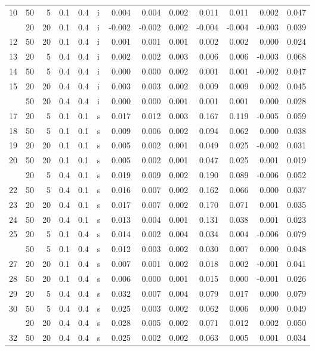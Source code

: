 \documentclass[
  11pt,
]{article}
\begin{document}
\begin{table}[!h]
{\begin{tabular}[t]{rrrrrlrrrrrrr}
10 & 50 & 5 & 0.1 & 0.4 & i & 0.004 & 0.004 & 0.002 & 0.011 & 0.011 & 0.002 & 0.047\\
\addlinespace
11 & 20 & 20 & 0.1 & 0.4 & i & -0.002 & -0.002 & 0.002 & -0.004 & -0.004 & -0.003 & 0.039\\
12 & 50 & 20 & 0.1 & 0.4 & i & 0.001 & 0.001 & 0.001 & 0.002 & 0.002 & 0.000 & 0.024\\
13 & 20 & 5 & 0.4 & 0.4 & i & 0.002 & 0.002 & 0.003 & 0.006 & 0.006 & -0.003 & 0.068\\
14 & 50 & 5 & 0.4 & 0.4 & i & 0.000 & 0.000 & 0.002 & 0.001 & 0.001 & -0.002 & 0.047\\
15 & 20 & 20 & 0.4 & 0.4 & i & 0.003 & 0.003 & 0.002 & 0.009 & 0.009 & 0.002 & 0.045\\
\addlinespace
16 & 50 & 20 & 0.4 & 0.4 & i & 0.000 & 0.000 & 0.001 & 0.001 & 0.001 & 0.000 & 0.028\\
17 & 20 & 5 & 0.1 & 0.1 & s & 0.017 & 0.012 & 0.003 & 0.167 & 0.119 & -0.005 & 0.059\\
18 & 50 & 5 & 0.1 & 0.1 & s & 0.009 & 0.006 & 0.002 & 0.094 & 0.062 & 0.000 & 0.038\\
19 & 20 & 20 & 0.1 & 0.1 & s & 0.005 & 0.002 & 0.001 & 0.049 & 0.025 & -0.002 & 0.031\\
20 & 50 & 20 & 0.1 & 0.1 & s & 0.005 & 0.002 & 0.001 & 0.047 & 0.025 & 0.001 & 0.019\\
\addlinespace
21 & 20 & 5 & 0.4 & 0.1 & s & 0.019 & 0.009 & 0.002 & 0.190 & 0.089 & -0.006 & 0.052\\
22 & 50 & 5 & 0.4 & 0.1 & s & 0.016 & 0.007 & 0.002 & 0.162 & 0.066 & 0.000 & 0.037\\
23 & 20 & 20 & 0.4 & 0.1 & s & 0.017 & 0.007 & 0.002 & 0.170 & 0.071 & 0.001 & 0.035\\
24 & 50 & 20 & 0.4 & 0.1 & s & 0.013 & 0.004 & 0.001 & 0.131 & 0.038 & 0.001 & 0.023\\
25 & 20 & 5 & 0.1 & 0.4 & s & 0.014 & 0.002 & 0.004 & 0.034 & 0.004 & -0.006 & 0.079\\
\addlinespace
26 & 50 & 5 & 0.1 & 0.4 & s & 0.012 & 0.003 & 0.002 & 0.030 & 0.007 & 0.000 & 0.048\\
27 & 20 & 20 & 0.1 & 0.4 & s & 0.007 & 0.001 & 0.002 & 0.018 & 0.002 & -0.001 & 0.041\\
28 & 50 & 20 & 0.1 & 0.4 & s & 0.006 & 0.000 & 0.001 & 0.015 & 0.000 & -0.001 & 0.026\\
29 & 20 & 5 & 0.4 & 0.4 & s & 0.032 & 0.007 & 0.004 & 0.079 & 0.017 & 0.000 & 0.079\\
30 & 50 & 5 & 0.4 & 0.4 & s & 0.025 & 0.003 & 0.002 & 0.062 & 0.006 & 0.000 & 0.049\\
\addlinespace
31 & 20 & 20 & 0.4 & 0.4 & s & 0.028 & 0.005 & 0.002 & 0.071 & 0.012 & 0.002 & 0.050\\
32 & 50 & 20 & 0.4 & 0.4 & s & 0.025 & 0.002 & 0.002 & 0.063 & 0.005 & 0.001 & 0.034\\
\bottomrule
\end{tabular}}
\end{table}
\end{document}
